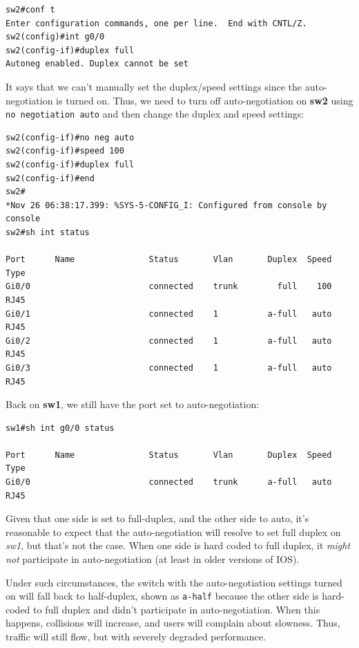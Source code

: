 \vspace{-15pt}
\begin{verbatim}
sw2#conf t
Enter configuration commands, one per line.  End with CNTL/Z.
sw2(config)#int g0/0
sw2(config-if)#duplex full
Autoneg enabled. Duplex cannot be set
\end{verbatim}
\vspace{-10pt}

\noindent
It says that we can't manually set the duplex/speed settings since the auto-negotiation is turned on. Thus, we need to turn off auto-negotiation on \textbf{sw2} using \verb|no negotiation auto| and then change the duplex and speed settings:

\vspace{-15pt}
\begin{verbatim}
sw2(config-if)#no neg auto
sw2(config-if)#speed 100
sw2(config-if)#duplex full
sw2(config-if)#end
sw2#
*Nov 26 06:38:17.399: %SYS-5-CONFIG_I: Configured from console by console
sw2#sh int status

Port      Name               Status       Vlan       Duplex  Speed Type
Gi0/0                        connected    trunk        full    100 RJ45
Gi0/1                        connected    1          a-full   auto RJ45
Gi0/2                        connected    1          a-full   auto RJ45
Gi0/3                        connected    1          a-full   auto RJ45
\end{verbatim}
\vspace{-10pt}

\noindent
Back on \textbf{sw1}, we still have the port set to auto-negotiation:

\vspace{-15pt}
\begin{verbatim}
sw1#sh int g0/0 status

Port      Name               Status       Vlan       Duplex  Speed Type
Gi0/0                        connected    trunk      a-full   auto RJ45
\end{verbatim}
\vspace{-10pt}

\noindent
Given that one side is set to full-duplex, and the other side to auto, it's reasonable to expect that the auto-negotiation will resolve to set full duplex on \textit{sw1}, but that's not the case. When one side is hard coded to full duplex, it \textit{might not} participate in auto-negotiation (at least in older versions of IOS). 

Under such circumstances, the switch with the auto-negotiation settings turned on will fall back to half-duplex, shown as \verb|a-half| because the other side is hard-coded to full duplex and didn't participate in auto-negotiation. When this happens, collisions will increase, and users will complain about slowness. Thus, traffic will still flow, but with severely degraded performance.

